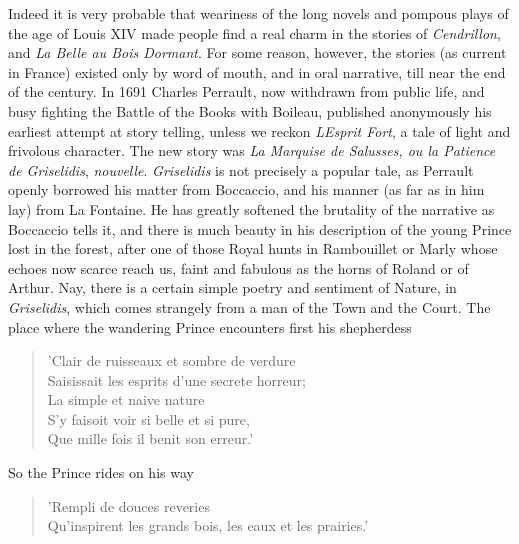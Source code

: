 \documentclass[14pt,a4paper]{memoir}
\begin{document}
Indeed it is very probable that weariness of the long novels and pompous
plays of the age of Louis XIV made people find a real charm in the
stories of \emph{Cendrillon}, and \emph{La Belle au Bois Dormant}. For
some reason, however, the stories (as current in France) existed only by
word of mouth, and in oral narrative, till near the end of the century.
In 1691 Charles Perrault, now withdrawn from public life, and busy
fighting the Battle of the Books with Boileau, published anonymously his
earliest attempt at story telling, unless we reckon
\emph{L\textquotesingle Esprit Fort}, a tale of light and frivolous
character. The new story was \emph{La Marquise de Salusses, ou la
Patience de Griselidis},
\emph{nouvelle}.
\emph{Griselidis} is not precisely a popular tale, as Perrault openly
borrowed his matter from Boccaccio, and his manner (as far as in him
lay) from La Fontaine. He has greatly softened the brutality of the
narrative as Boccaccio tells it, and there is much beauty in his
description of the young Prince lost in the forest, after one of those
Royal hunts in Rambouillet or Marly whose echoes now scarce reach us,
faint and fabulous as the horns of Roland or of
Arthur.
Nay, there is a certain simple poetry and sentiment of Nature, in
\emph{Griselidis}, which comes strangely from a man of the Town and the
Court. The place where the wandering Prince encounters first his
shepherdess

\begin{verse}
  \small
'Clair de ruisseaux et sombre de verdure \\
Saisissait les esprits d'une secrete horreur; \\
\vin La simple et naive nature \\
\vin S'y faisoit voir si belle et si pure, \\
\vin Que mille fois il benit son erreur.'
\end{verse}

So the Prince rides on his way

\begin{verse}
  \small
\vin 'Rempli de douces reveries \\
Qu'inspirent les grands bois, les eaux et les prairies.'
\end{verse}
\end{document}
